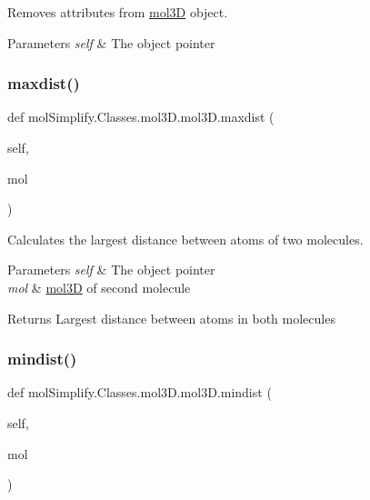 Removes attributes from \hyperlink{classmolSimplify_1_1Classes_1_1mol3D_1_1mol3D}{mol3D} object. 


\begin{DoxyParams}{Parameters}
{\em self} & The object pointer \\
\hline
\end{DoxyParams}
\mbox{\label{classmolSimplify_1_1Classes_1_1mol3D_1_1mol3D_a7d3399262fb568aeec589f86ff59d376}} 
\subsubsection{\texorpdfstring{maxdist()}{maxdist()}}
{\footnotesize\ttfamily def mol\+Simplify.\+Classes.\+mol3\+D.\+mol3\+D.\+maxdist (\begin{DoxyParamCaption}\item[{}]{self,  }\item[{}]{mol }\end{DoxyParamCaption})}



Calculates the largest distance between atoms of two molecules. 


\begin{DoxyParams}{Parameters}
{\em self} & The object pointer \\
\hline
{\em mol} & \hyperlink{classmolSimplify_1_1Classes_1_1mol3D_1_1mol3D}{mol3D} of second molecule \\
\hline
\end{DoxyParams}
\begin{DoxyReturn}{Returns}
Largest distance between atoms in both molecules 
\end{DoxyReturn}
\mbox{\label{classmolSimplify_1_1Classes_1_1mol3D_1_1mol3D_ab051fea5908eab8ddcd39d4ea4688657}} 
\subsubsection{\texorpdfstring{mindist()}{mindist()}}
{\footnotesize\ttfamily def mol\+Simplify.\+Classes.\+mol3\+D.\+mol3\+D.\+mindist (\begin{DoxyParamCaption}\item[{}]{self,  }\item[{}]{mol }\end{DoxyParamCaption})}



